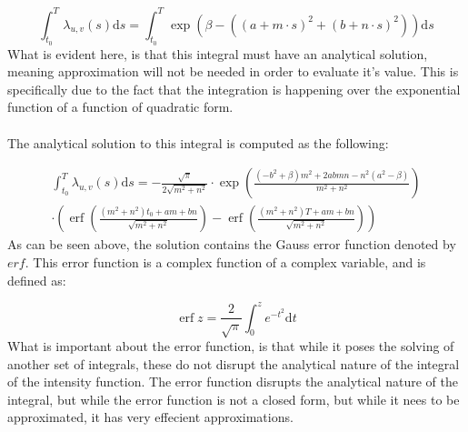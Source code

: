 \begin{equation}
    \int_{t_0}^T \lambda_{u,v}(s) \mathrm{d}s 
    =
    \int_{t_0}^T \exp \left(\beta - \left((a + m \cdot s)^2 + (b + n \cdot s)^2\right)\right) \mathrm{d}s
\end{equation}
What is evident here, is that this integral must have an analytical solution, meaning approximation will not be needed in order to evaluate it's value. 
This is specifically due to the fact that the integration is happening over the exponential function of a function of quadratic form.
\\\\
The analytical solution to this integral is computed as the following:

\begin{align}
    \int_{t_0}^T \lambda_{u,v}(s) \mathrm{d}s
    = 
    -\frac{\sqrt{\pi}}{2 \sqrt{m^{2}+n^{2}}}
    \cdot
    \exp\left(\frac{\left(-b^{2}+\beta\right) m^{2}+2abmn-n^{2}(a^{2}-\beta)}{m^{2}+n^{2}}\right)
    \\
    \cdot 
    \left(
    \operatorname{erf}\left(\frac{\left(m^{2}+n^{2}\right)t_{0}+am+b n}{\sqrt{m^{2}+n^{2}}}\right)
    -\operatorname{erf}\left(\frac{\left(m^{2}+n^{2}\right)T+am+b n}{\sqrt{m^{2}+n^{2}}}\right)
    \right)
    \label{eq:analytical_integral}
\end{align}
As can be seen above, the solution contains the Gauss error function denoted by $erf$.
This error function is a complex function of a complex variable, and is defined as:

\begin{equation}
\operatorname{erf} z=\frac{2}{\sqrt{\pi}} \int_{0}^{z} e^{-t^{2}} \mathrm{d} t
\end{equation}
What is important about the error function, is that while it poses the solving of another set of integrals, these do not disrupt the analytical nature of the integral of the intensity function.
The error function disrupts the analytical nature of the integral, but while the error function is not a closed form, but while it nees to be approximated, it has very effecient approximations.